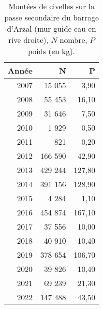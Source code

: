 \begin{table}[htbp]
\centering
\begin{tabular}{rrr}
  \hline
Année & N & P \\ 
  \hline
2007 & 15 055 & 3,90 \\ 
  2008 & 55 453 & 16,10 \\ 
  2009 & 31 646 & 7,50 \\ 
  2010 & 1 929 & 0,50 \\ 
  2011 & 821 & 0,20 \\ 
  2012 & 166 590 & 42,90 \\ 
  2013 & 429 244 & 127,80 \\ 
  2014 & 391 156 & 128,90 \\ 
  2015 & 4 284 & 1,10 \\ 
  2016 & 454 874 & 167,10 \\ 
  2017 & 37 556 & 10,00 \\ 
  2018 & 40 910 & 10,40 \\ 
  2019 & 378 654 & 106,70 \\ 
  2020 & 39 826 & 10,40 \\ 
  2021 & 69 239 & 21,30 \\ 
  2022 & 147 488 & 43,50 \\ 
   \hline
\end{tabular}
\caption{Montées de civelles sur la passe secondaire du barrage d'Arzal (mur guide eau en rive droite), $N$ nombre,
				$P$ poids (en kg).} 
\label{table_civelle_12}
\end{table}
